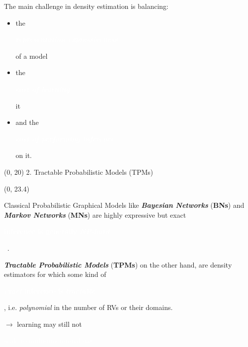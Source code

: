 \documentclass[final]{beamer}
\newcommand{\highlighttext}[2][yellow]{{\colorbox{#1}{\strut\textcolor{white}{#2}}}}
\begin{document}
\begin{frame}{}
\begin{textblock}{17.5}
    The main challenge in density estimation is balancing:
    \begin{itemize}
    \item the \highlighttext[lacamlilac]{\textbf{\emph{representation expressiveness}}} of a model
    \item the \highlighttext[gold4]{\textbf{\emph{cost of learning}}} it
      \item and the \highlighttext[petroil2]{\textbf{\emph{cost of performing inference}}} on it.
    \end{itemize}
    

    
    

  \end{textblock}

  \begin{textblock}{17.5}(0, 20)
    2. Tractable Probabilistic Models (TPMs)
  \end{textblock}
  
  \begin{textblock}{17.5}(0, 23.4)
    \small

    Classical Probabilistic Graphical Models like \emph{\textbf{Bayesian Networks}}
    (\textbf{BNs}) and \emph{\textbf{Markov Networks}} (\textbf{MNs}) are highly expressive but
    exact \highlighttext[petroil2]{\textbf{inference is generally \emph{NP-hard}}}~\cite{Roth1996}.
    \vspace{20pt}

    
    \emph{\textbf{Tractable Probabilistic Models} }  (\textbf{TPMs})
    on the other hand, are density estimators for which some kind of  \highlighttext[petroil2]{\textbf{\emph{exact}} \textbf{inference is}
    \textbf{\emph{tractable}}}, i.e. \emph{polynomial} in the number of RVs or their
    domains.\par
    \hfill$\rightarrow$ learning  may still not \highlighttext[gold4]{scale to
    multidimensional data}\\[30pt]


\end{textblock}
\end{frame}
\end{document}
